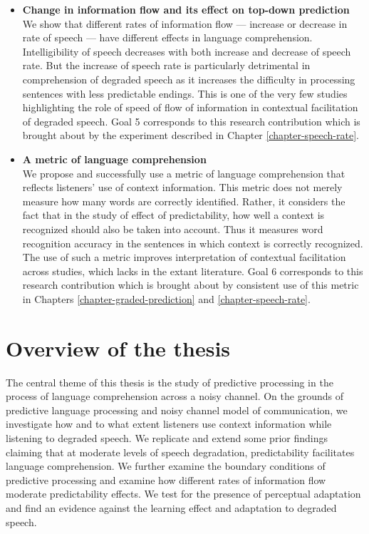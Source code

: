 \documentclass[a4paper, nobind]{templates/ociamthesis}
\begin{document}
\begin{itemize}
\item
  \textbf{Change in information flow and its effect on top-down prediction}\\
  We show that different rates of information flow --- increase or decrease in rate of speech --- have different effects in language comprehension.
  Intelligibility of speech decreases with both increase and decrease of speech rate.
  But the increase of speech rate is particularly detrimental in comprehension of degraded speech as it increases the difficulty in processing sentences with less predictable endings.
  This is one of the very few studies highlighting the role of speed of flow of information in contextual facilitation of degraded speech.
  Goal 5 corresponds to this research contribution which is brought about by the experiment described in Chapter \ref{chapter-speech-rate}.
\item
  \textbf{A metric of language comprehension}\\
  We propose and successfully use a metric of language comprehension that reflects listeners' use of context information.
  This metric does not merely measure how many words are correctly identified.
  Rather, it considers the fact that in the study of effect of predictability, how well a context is recognized should also be taken into account.
  Thus it measures word recognition accuracy in the sentences in which context is correctly recognized.
  The use of such a metric improves interpretation of contextual facilitation across studies, which lacks in the extant literature.
  Goal 6 corresponds to this research contribution which is brought about by consistent use of this metric in Chapters \ref{chapter-graded-prediction} and \ref{chapter-speech-rate}.
\end{itemize}

\hypertarget{overview-of-the-thesis}{%
\section{Overview of the thesis}\label{overview-of-the-thesis}}

The central theme of this thesis is the study of predictive processing in the process of language comprehension across a noisy channel.
On the grounds of predictive language processing and noisy channel model of communication,
we investigate how and to what extent listeners use context information while listening to degraded speech.
We replicate and extend some prior findings claiming that at moderate levels of speech degradation,
predictability facilitates language comprehension.
We further examine the boundary conditions of predictive processing and examine how different rates of information flow moderate predictability effects.
We test for the presence of perceptual adaptation and find an evidence against the learning effect and adaptation to degraded speech.
\end{document}
